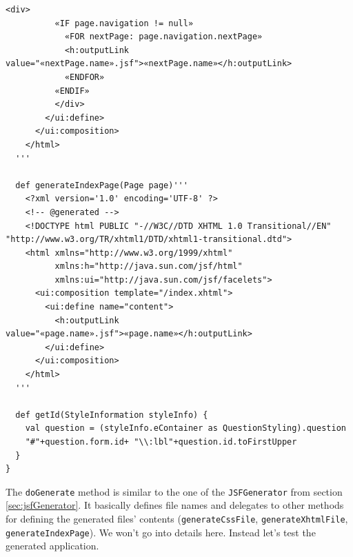 \begin{lstlisting}[language=Xtend]
	  	  <div>
	  	  «IF page.navigation != null»
	  	    «FOR nextPage: page.navigation.nextPage»
	  	    <h:outputLink value="«nextPage.name».jsf">«nextPage.name»</h:outputLink>
	  	    «ENDFOR»
	  	  «ENDIF»
		  </div>
	    </ui:define>
	  </ui:composition>
	</html>
  '''
    
  def generateIndexPage(Page page)'''
	<?xml version='1.0' encoding='UTF-8' ?>
	<!-- @generated -->
	<!DOCTYPE html PUBLIC "-//W3C//DTD XHTML 1.0 Transitional//EN" "http://www.w3.org/TR/xhtml1/DTD/xhtml1-transitional.dtd">
	<html xmlns="http://www.w3.org/1999/xhtml"
	      xmlns:h="http://java.sun.com/jsf/html"
	      xmlns:ui="http://java.sun.com/jsf/facelets">
	  <ui:composition template="/index.xhtml">
	    <ui:define name="content">
	      <h:outputLink value="«page.name».jsf">«page.name»</h:outputLink>
	    </ui:define>
	  </ui:composition>
	</html>
  '''	
	
  def getId(StyleInformation styleInfo) {
    val question = (styleInfo.eContainer as QuestionStyling).question
    "#"+question.form.id+ "\\:lbl"+question.id.toFirstUpper
  }
}
\end{lstlisting}

The \texttt{doGenerate} method is similar to the one of the
\texttt{JSFGenerator} from section \ref{sec:jsfGenerator}. It basically defines
file names and delegates to other methods for defining the generated files'
contents (\texttt{generateCssFile}, \texttt{generateXhtmlFile},
\texttt{generateIndexPage}). We won't go into details here. Instead let's test
the generated application.
